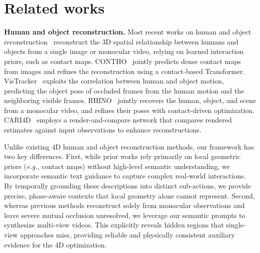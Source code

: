 \section{Related works}
\label{sec:related_works}
\noindent\textbf{Human and object reconstruction.}
Most recent works on human and object reconstruction~\cite{chen2019holistic++,zhang2020perceiving,xie2022chore,nam2024contho,xie2023templatefree,dwivedi2025interactvlm,wen2025reconstructing,li2025scorehoi,xu2021d3d,xie2023visibility,xue2026rhino,xie2025intertrack,xie2026cari4d,wen2025efficient,huang2026recovering} reconstruct the 3D spatial relationship between humans and objects from a single image or monocular video, relying on learned interaction priors, such as contact maps.
CONTHO~\cite{nam2024contho} jointly predicts dense contact maps from images and refines the reconstruction using a contact-based Transformer.
VisTracker~\cite{xie2023visibility} exploits the correlation between human and object motion, predicting the object pose of occluded frames from the human motion and the neighboring visible frames.
RHINO~\cite{xue2026rhino} jointly recovers the human, object, and scene from a monocular video, and refines their poses with contact-driven optimization.
CARI4D~\cite{xie2026cari4d} employs a render-and-compare network that compares rendered estimates against input observations to enhance reconstructions.


Unlike existing 4D human and object reconstruction methods, our framework has two key differences.
First, while prior works rely primarily on local geometric priors (\textit{e.g.}, contact maps) without high-level semantic understanding, we incorporate semantic text guidance to capture complex real-world interactions. By temporally grounding these descriptions into distinct sub-actions, we provide precise, phase-aware contexts that local geometry alone cannot represent.
Second, whereas previous methods reconstruct solely from monocular observations and leave severe mutual occlusion unresolved, we leverage our semantic prompts to synthesize multi-view videos. This explicitly reveals hidden regions that single-view approaches miss, providing reliable and physically consistent auxiliary evidence for the 4D optimization.


